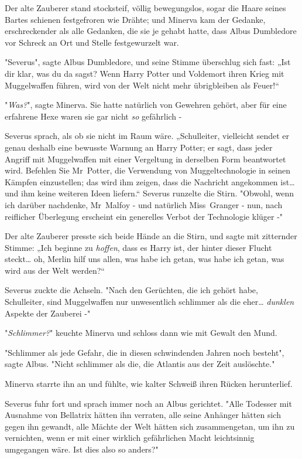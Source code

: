 {Der alte Zauberer stand stocksteif, völlig bewegungslos, sogar die Haare seines Bartes schienen festgefroren wie Drähte; und Minerva kam der Gedanke, erschreckender als alle Gedanken, die sie je gehabt hatte, dass Albus Dumbledore vor Schreck an Ort und Stelle festgewurzelt war.

"Severus", sagte Albus Dumbledore, und seine Stimme überschlug sich fast: „Ist dir klar, was du da sagst? Wenn Harry Potter und Voldemort ihren Krieg mit Muggelwaffen führen, wird von der Welt nicht mehr übrigbleiben als Feuer!“

"\emph{Was?}", sagte Minerva. Sie hatte natürlich von Gewehren gehört, aber für eine erfahrene Hexe waren sie gar nicht \emph{so} gefährlich -

Severus sprach, als ob sie nicht im Raum wäre. „Schulleiter, vielleicht sendet er genau deshalb eine bewusste Warnung an Harry Potter; er sagt, dass jeder Angriff mit Muggelwaffen mit einer Vergeltung in derselben Form beantwortet wird. Befehlen Sie Mr~Potter, die Verwendung von Muggeltechnologie in seinen Kämpfen einzustellen; das wird ihm zeigen, dass die Nachricht angekommen ist… und ihm keine weiteren Ideen liefern.“ Severus runzelte die Stirn. "Obwohl, wenn ich darüber nachdenke, Mr~Malfoy - und natürlich Miss~Granger - nun, nach reiflicher Überlegung erscheint ein generelles Verbot der Technologie klüger -"

Der alte Zauberer presste sich beide Hände an die Stirn, und sagte mit zitternder Stimme: „Ich beginne zu \emph{hoffen}, dass es Harry ist, der hinter dieser Flucht steckt… oh, Merlin hilf uns allen, was habe ich getan, was habe ich getan, was wird aus der Welt werden?“

Severus zuckte die Achseln. "Nach den Gerüchten, die ich gehört habe, Schulleiter, sind Muggelwaffen nur unwesentlich schlimmer als die eher… \emph{dunklen} Aspekte der Zauberei -"

"\emph{Schlimmer?}" keuchte Minerva und schloss dann wie mit Gewalt den Mund.

"Schlimmer als jede Gefahr, die in diesen schwindenden Jahren noch besteht", sagte Albus. "Nicht schlimmer als die, die Atlantis aus der Zeit auslöschte."

Minerva starrte ihn an und fühlte, wie kalter Schweiß ihren Rücken herunterlief.

Severus fuhr fort und sprach immer noch an Albus gerichtet. "Alle Todesser mit Ausnahme von Bellatrix hätten ihn verraten, alle seine Anhänger hätten sich gegen ihn gewandt, alle Mächte der Welt hätten sich zusammengetan, um ihn zu vernichten, wenn er mit einer wirklich gefährlichen Macht leichtsinnig umgegangen wäre. Ist dies also so anders?"

}

